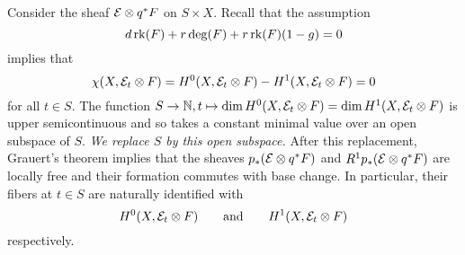 \documentclass[letterpaper,10pt]{article}
\theoremstyle{remark}
\begin{document}
Consider the sheaf $\mathcal{E} \otimes q^*F$ on $S \times X$. Recall that the assumption
\[ d \operatorname{\mathrm{rk}}(F) + r \deg(F) + r \operatorname{\mathrm{rk}}(F) (1-g) = 0 \]
implies that 
\[ \chi(X, \mathcal{E}_t \otimes F) = H^0(X, \mathcal{E}_t \otimes F) - H^1(X, \mathcal{E}_t \otimes F) = 0 \] 
for all $t \in S$. The function $S \to \mathbb{N}, t \mapsto \dim H^0(X, \mathcal{E}_t \otimes F) = \dim H^1(X, \mathcal{E}_t \otimes F)$ is upper semicontinuous and so takes a constant minimal value over an open subspace of $S$. \emph{We replace $S$ by this open subspace.} After this replacement, Grauert's theorem implies that the sheaves $p_*(\mathcal{E} \otimes q^*F)$ and $R^1 p_*(\mathcal{E} \otimes q^*F)$ are locally free and their formation commutes with base change. In particular, their fibers at $t \in S$ are naturally identified with 
\[ H^0(X, \mathcal{E}_t \otimes F) \qquad \mathrm{and} \qquad H^1(X, \mathcal{E}_t \otimes F) \] respectively.
\end{document}
